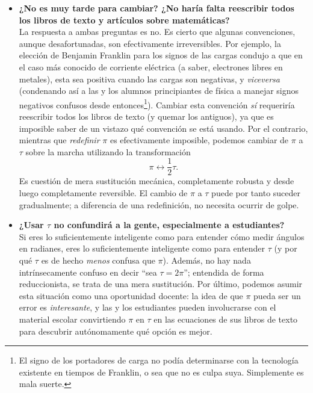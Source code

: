 \begin{itemize}
  \item \textbf{¿No es muy tarde para cambiar? ¿No haría falta reescribir todos los libros de texto y artículos sobre matemáticas?} \\ La respuesta a ambas preguntas es no. Es cierto que algunas convenciones, aunque desafortunadas, son efectivamente irreversibles. Por ejemplo, la elección de Benjamin Franklin para los signos de las cargas condujo a que en el caso más conocido de corriente eléctrica (a saber, electrones libres en metales), esta sea positiva cuando las cargas son negativas, y \emph{viceversa} (condenando así a las y los alumnos principiantes de física a manejar signos negativos confusos desde entonces\footnote{El signo de los portadores de carga no podía determinarse con la tecnología existente en tiempos de Franklin, o sea que no es culpa suya. Simplemente es mala suerte.}). Cambiar esta convención \emph{sí} requeriría reescribir todos los libros de texto (y quemar los antiguos), ya que es imposible saber de un vistazo qué convención se está usando. Por el contrario, mientras que \emph{redefinir} $\pi$ es efectivamente imposible, podemos cambiar de $\pi$ a $\tau$ sobre la marcha utilizando la transformación \[ \pi \leftrightarrow \textstyle{\frac{1}{2}}\tau. \] Es cuestión de mera sustitución mecánica, completamente robusta y desde luego completamente reversible. El cambio de  $\pi$ a $\tau$ puede por tanto suceder gradualmente; a diferencia de una redefinición, no necesita ocurrir de golpe. 


  \item \textbf{¿Usar $\tau$ no confundirá a la gente, especialmente a estudiantes?} \\  Si eres lo suficientemente inteligente como para entender cómo medir ángulos en radianes, eres lo suficientemente inteligente como para entender $\tau$ (y por qué $\tau$ es de hecho \emph{menos} confusa que $\pi$). Además, no hay nada intrínsecamente confuso en decir ``sea $\tau = 2\pi$''; entendida de forma reduccionista, se trata de una mera sustitución. Por último, podemos asumir esta situación como una oportunidad docente: la idea de que $\pi$ pueda ser un error es \emph{interesante}, y las y los estudiantes pueden involucrarse con el material escolar convirtiendo $\pi$ en $\tau$ en las ecuaciones de sus libros de texto para descubrir autónomamente qué opción es mejor. 



\end{itemize}
